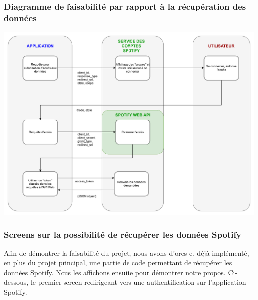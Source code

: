\documentclass[12pt, openany]{report}
\begin{document}
 \subsubsection{Diagramme de faisabilité par rapport à la récupération des données}
   
   \includegraphics[scale=0.17]{images/schema_faisa_1.png}
   
   \newpage
   
 \subsubsection{Screens sur la possibilité de récupérer les données Spotify}
 
    Afin de démontrer la faisabilité du projet, nous avons d'ores et déjà implémenté, en plus du projet principal, une partie de code permettant de récupérer les données Spotify. Nous les affichons ensuite pour démontrer notre propos. Ci-dessous, le premier screen redirigeant vers une authentification sur l'application Spotify.
    \\
    \\
 
\end{document}
